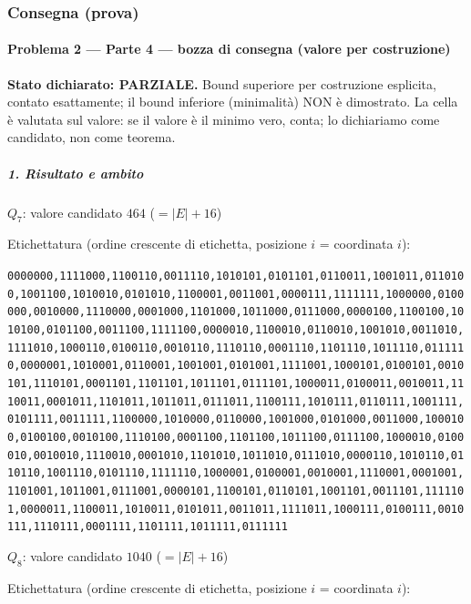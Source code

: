 \documentclass[11pt,a4paper]{article}
\begin{document}
\subsubsection{Consegna (prova)}
\paragraph{Problema 2 --- Parte 4 --- bozza di consegna (valore per
costruzione)}\label{problema-2-parte-4-bozza-di-consegna-valore-per-costruzione}

\textbf{Stato dichiarato: PARZIALE.} Bound superiore per costruzione
esplicita, contato esattamente; il bound inferiore (minimalità) NON è
dimostrato. La cella è valutata sul valore: se il valore è il minimo
vero, conta; lo dichiariamo come candidato, non come teorema.

\subparagraph{1. Risultato e ambito}\label{risultato-e-ambito}

\(Q_7\): valore candidato \(464\) (\(=|E|+16\))

Etichettatura (ordine crescente di etichetta, posizione \(i\) =
coordinata \(i\)):

\texttt{0000000,1111000,1100110,0011110,1010101,0101101,0110011,1001011,0110100,1001100,1010010,0101010,1100001,0011001,0000111,1111111,1000000,0100000,0010000,1110000,0001000,1101000,1011000,0111000,0000100,1100100,1010100,0101100,0011100,1111100,0000010,1100010,0110010,1001010,0011010,1111010,1000110,0100110,0010110,1110110,0001110,1101110,1011110,0111110,0000001,1010001,0110001,1001001,0101001,1111001,1000101,0100101,0010101,1110101,0001101,1101101,1011101,0111101,1000011,0100011,0010011,1110011,0001011,1101011,1011011,0111011,1100111,1010111,0110111,1001111,0101111,0011111,1100000,1010000,0110000,1001000,0101000,0011000,1000100,0100100,0010100,1110100,0001100,1101100,1011100,0111100,1000010,0100010,0010010,1110010,0001010,1101010,1011010,0111010,0000110,1010110,0110110,1001110,0101110,1111110,1000001,0100001,0010001,1110001,0001001,1101001,1011001,0111001,0000101,1100101,0110101,1001101,0011101,1111101,0000011,1100011,1010011,0101011,0011011,1111011,1000111,0100111,0010111,1110111,0001111,1101111,1011111,0111111}

\(Q_8\): valore candidato \(1040\) (\(=|E|+16\))

Etichettatura (ordine crescente di etichetta, posizione \(i\) =
coordinata \(i\)):
\end{document}

